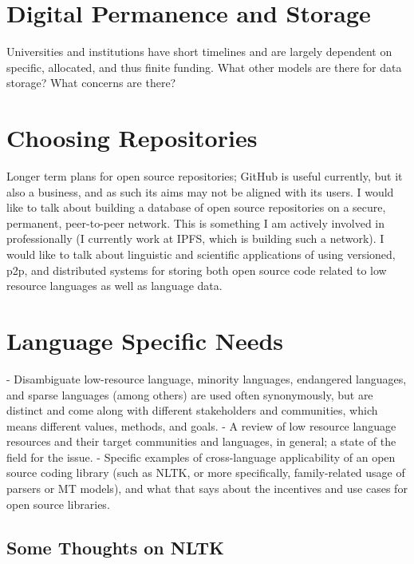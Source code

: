\documentclass[10pt, a4paper]{article}
\begin{document}
\section{Digital Permanence and Storage}

Universities and institutions have short timelines and are largely dependent on specific, allocated, and thus finite funding. What other models are there for data storage? What concerns are there?

\section{Choosing Repositories}

Longer term plans for open source repositories; GitHub is useful currently, but it also a business, and as such its aims may not be aligned with its users. I would like to talk about building a database of open source repositories on a secure, permanent, peer-to-peer network. This is something I am actively involved in professionally (I currently work at IPFS, which is building such a network). I would like to talk about linguistic and scientific applications of using versioned, p2p, and distributed systems for storing both open source code related to low resource languages as well as language data.

\section{Language Specific Needs}

- Disambiguate low-resource language, minority languages, endangered languages, and sparse languages (among others) are used often synonymously, but are distinct and come along with different stakeholders and communities, which means different values, methods, and goals.
- A review of low resource language resources and their target communities and languages, in general; a state of the field for the issue.
- Specific examples of cross-language applicability of an open source coding library (such as NLTK, or more specifically, family-related usage of parsers or MT models), and what that says about the incentives and use cases for open source libraries.

\subsection{Some Thoughts on NLTK}
\end{document}
